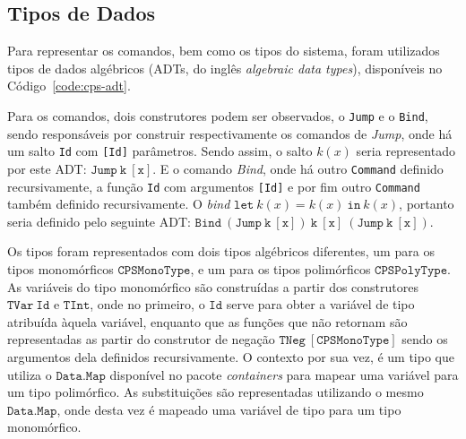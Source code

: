\subsection{Tipos de Dados}\label{subsec:cps-adt}

Para representar os comandos, bem como os tipos do sistema, foram utilizados tipos de dados algébricos (ADTs, do inglês \textit{algebraic data types}), disponíveis no Código~\ref{code:cps-adt}.


Para os comandos, dois construtores podem ser observados, o \texttt{Jump} e o \texttt{Bind}, sendo responsáveis por construir respectivamente os comandos de \textit{Jump}, onde há um salto \texttt{Id} com \texttt{[Id]} parâmetros.
Sendo assim, o salto $k(x)$ seria representado por este ADT: $\mathtt{Jump\ k\ [x]}$.
E o comando \textit{Bind}, onde há outro \texttt{Command} definido recursivamente, a função \texttt{Id} com argumentos \texttt{[Id]} e por fim outro \texttt{Command} também definido recursivamente.
O \textit{bind} $\mathtt{let}\ k(x) = k(x)\ \mathtt{in}\ k(x)$, portanto seria definido pelo seguinte ADT: $\mathtt{Bind\ (Jump\ k\ [x])\ k\ [x]\ (Jump\ k\ [x])}$.

Os tipos foram representados com dois tipos algébricos diferentes, um para os tipos monomórficos $\mathtt{CPSMonoType}$, e um para os tipos polimórficos $\mathtt{CPSPolyType}$.
As variáveis do tipo monomórfico são construídas a partir dos construtores $\mathtt{TVar\ Id}$ e $\mathtt{TInt}$, onde no primeiro, o $\mathtt{Id}$ serve para obter a variável de tipo atribuída àquela variável, enquanto que as funções que não retornam são representadas as partir do construtor de negação $\mathtt{TNeg\ [CPSMonoType]}$ sendo os argumentos dela definidos recursivamente.
O contexto por sua vez, é um tipo que utiliza o $\mathtt{Data.Map}$ disponível no pacote \textit{containers} para mapear uma variável para um tipo polimórfico.
As substituições são representadas utilizando o mesmo $\mathtt{Data.Map}$, onde desta vez é mapeado uma variável de tipo para um tipo monomórfico.

